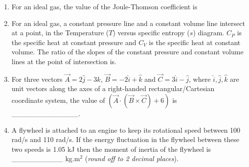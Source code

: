 \documentclass[12pt,onecolumn]{article}
\begin{document}
\begin{enumerate}
    \item For an ideal gas, the value of the Joule-Thomson coefficient is
          \begin{enumerate}
          \end{enumerate}

    \item For an ideal gas, a constant pressure line and a constant volume line intersect at a point, in the Temperature ($T$) versus specific entropy ($s$) diagram. $C_P$ is the specific heat at constant pressure and $C_V$ is the specific heat at constant volume. The ratio of the slopes of the constant pressure and constant volume lines at the point of intersection is.
          \begin{enumerate}
          \end{enumerate}

    \item For three vectors $\vec{A} = 2\hat{j} - 3\hat{k}$, $\vec{B} = -2\hat{i} + \hat{k}$ and $\vec{C} = 3\hat{i} - \hat{j}$, where $\hat{i}, \hat{j}, \hat{k}$ are unit vectors along the axes of a right-handed rectangular/Cartesian coordinate system, the value of $\left(\vec{A}\cdot\left(\vec{B}\times\vec{C}\right)+6\right)$ is \_\_\_\_\_\_\_\_\_\_\_\_\_.

    \item A flywheel is attached to an engine to keep its rotational speed between 100 rad/s and 110 rad/s. If the energy fluctuation in the flywheel between these two speeds is 1.05 kJ then the moment of inertia of the flywheel is \_\_\_\_\_\_\_\_\_\_ kg.m$^2$ (\textit{round off to 2 decimal places}).


\end{enumerate}
\end{document}
